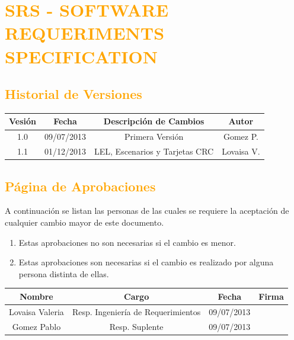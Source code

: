 \chapter{\textcolor{orange}{SRS - SOFTWARE REQUERIMENTS SPECIFICATION}}
\newpage
\section{\textcolor{orange}{Historial de Versiones}}
\begin{table}[H]
\begin{center}
\begin{tabular}{|c|c|c|c|}
\hline
\rowcolor[RGB]{255,127,0} Vesión & Fecha & Descripción de Cambios & Autor\\
\hline
1.0 & 09/07/2013 & Primera Versión & Gomez P.\\
\hline
1.1 & 01/12/2013 & LEL, Escenarios y Tarjetas CRC & Lovaisa V.\\
\hline

\end{tabular}
\end{center}
\end{table}
\newpage

\section{\textcolor{orange}{Página de Aprobaciones}}
A continuación se listan las personas de las cuales se requiere la aceptación de cualquier cambio mayor de este documento.
\begin{enumerate}
  \item Estas aprobaciones no son necesarias si el cambio es menor.
  \item Estas aprobaciones son necesarias si el cambio es realizado por alguna
  persona distinta de ellas.
\end{enumerate}
\begin{table}[h!]
\begin{center}
\begin{tabular}{|c|c|c|c|}
\hline
\rowcolor[RGB]{255,127,0} Nombre & Cargo & Fecha & Firma\\
\hline
Lovaisa Valeria & Resp. Ingeniería de Requerimientos & 09/07/2013 & \\
\hline
Gomez Pablo & Resp. Suplente & 09/07/2013 & \\
\hline
\end{tabular}
\end{center}
\end{table}

